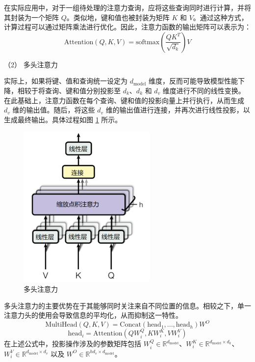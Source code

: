 在实际应用中，对于一组待处理的注意力查询，应将这些查询同时进行计算，并将其封装为一个矩阵 \(Q\)。类似地，键和值也被封装为矩阵 \(K\) 和 \(V\)。通过这种方式，计算过程可以通过矩阵乘法进行优化。因此，注意力函数的输出矩阵可以表示为：
\begin{equation}
\text{Attention}(Q,K,V) = \text{softmax}(\frac{QK^T}{\sqrt{d_k}})V
\label{eq3.1}
\end{equation}

（2） 多头注意力

实际上，如果将键、值和查询统一设定为 \(d_{\text{model}}\) 维度，反而可能导致模型性能下降，相较于将查询、键和值分别投影至 \(d_k\)、\(d_k\) 和 \(d_v\) 维度进行不同的线性变换。在此基础上，注意力函数在每个查询、键和值的投影向量上并行执行，从而生成 \(d_v\) 维的输出值。随后，将这些 \(d_v\) 维的输出值进行连接，并再次进行线性投影，以生成最终输出。具体过程如图 \ref{fig:MultiheadAtt} 所示。

\begin{figure}[htbp]
	\centering
	\includegraphics[scale = 0.8]{figures/MultiheadAtt}
	\caption{多头注意力 \cite{transformer}}
	\label{fig:MultiheadAtt}
\end{figure}

多头注意力的主要优势在于其能够同时关注来自不同位置的信息。相较之下，单一注意力头的使用会导致信息的平均化，从而抑制这一特性。
\begin{equation}
\text{MultiHead}(Q, K, V) = \text{Concat}(\text{head}_1, ..., \text{head}_h)W^O
\label{eq3.2}
\end{equation}
\begin{equation}
\text{head}_i = \text{Attention}(QW_i^Q, KW_i^K, VW_i^V)
\label{eq3.3}
\end{equation}
在上述公式中，投影操作涉及的参数矩阵包括 \(W_i^Q \in \mathbb{R}^{d_{\text{model}}}\)、\(W_i^K \in \mathbb{R}^{d_{\text{model}} \times d_k}\)、\(W_i^V \in \mathbb{R}^{d_{\text{model}} \times d_v}\) 以及 \(W^O \in \mathbb{R}^{hd_v \times d_{\text{model}}}\)。

